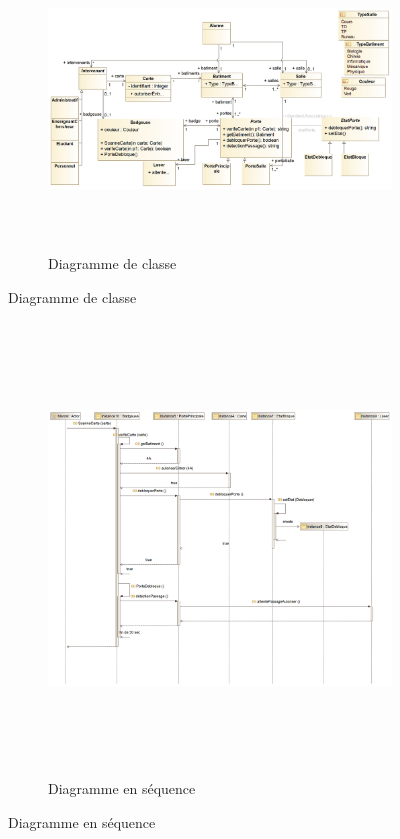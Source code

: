 \documentclass[a4paper,10pt]{article}
\begin{document}
    \begin{figure}[h]
        \begin{subfigure}{1.0\textwidth}
            \includegraphics[width=1.2\linewidth, height=8cm]{image/classe.png}
             \caption{Diagramme de classe}
             \label{fig:classe}
        \end{subfigure}

    \end{figure}


    \begin{figure}[h]
        \begin{subfigure}{1.0\textwidth}

        \includegraphics[width=1\linewidth, height=12cm]{image/sequence.png}   
        \caption{Diagramme en séquence}
        \label{fig:sequence}
        \end{subfigure}

    \end{figure}
\end{document}
